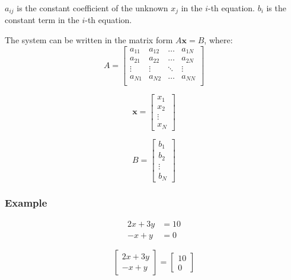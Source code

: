 \documentclass[11pt]{article}
\begin{document}
\(a_{ij}\) is the constant coefficient of the unknown \(x_j\) in the \(i\)-th equation.
\(b_i\) is the constant term in the \(i\)-th equation.

The system can be written in the matrix form \(A \boldsymbol{x} = B\), where:
\begin{displaymath}
A = \begin{bmatrix}
a_{11} & a_{12} & \ldots & a_{1N} \\
a_{21} & a_{22} & \ldots & a_{2N} \\
\vdots & \vdots & \ddots & \vdots \\
a_{N1} & a_{N2} & \ldots & a_{NN} \\
\end{bmatrix}
\end{displaymath}

\begin{displaymath}
\boldsymbol{x} = \begin{bmatrix}
x_1 \\
x_2 \\
\vdots \\
x_N
\end{bmatrix}
\end{displaymath}

\begin{displaymath}
B = \begin{bmatrix}
b_1 \\
b_2 \\
\vdots \\
b_N
\end{bmatrix}
\end{displaymath}

\subsubsection{Example}
\label{sec:org2200d1c}
\begin{align*}
2x + 3y &= 10 \\
-x + y &= 0
\end{align*}

\begin{displaymath}
\begin{bmatrix}
2x + 3y \\
-x + y
\end{bmatrix} = \begin{bmatrix}
10 \\
0
\end{bmatrix}
\end{displaymath}
\end{document}
